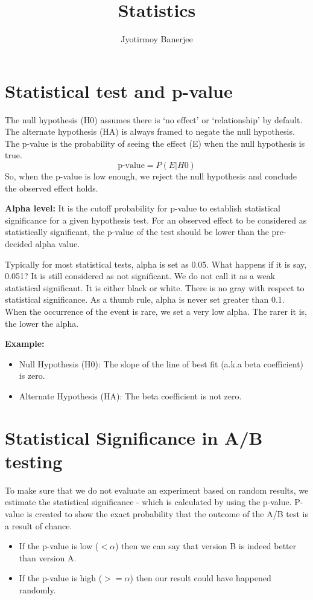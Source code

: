 \documentclass{article}
\title{Statistics}
\author{Jyotirmoy Banerjee}
\begin{document}
\maketitle

\section{Statistical test and p-value}
The null hypothesis (H0) assumes there is `no effect' or `relationship' by default. The alternate hypothesis (HA) is always framed to negate the null hypothesis. The p-value is the probability of seeing the effect (E) when the null hypothesis is true.
\[
\text{p-value} = P(E|H0)
\]
So, when the p-value is low enough, we reject the null hypothesis and conclude the observed effect holds.

\textbf{Alpha level:}
It is the cutoff probability for p-value to establish statistical significance for a given hypothesis test.
For an observed effect to be considered as statistically significant, the p-value of the test should be lower than the pre-decided alpha value.

Typically for most statistical tests, alpha is set as 0.05. 
What happens if it is say, 0.051? It is still considered as not significant. We do not call it as a weak statistical significant. It is either black or white. There is no gray with respect to statistical significance.
As a thumb rule, alpha is never set greater than 0.1. When the occurrence of the event is rare, we set a very low alpha. The rarer it is, the lower the alpha.

\textbf{Example:}
\vspace{-\topsep}
\begin{itemize}
\itemsep0em
\item Null Hypothesis (H0): The slope of the line of best fit (a.k.a beta coefficient) is zero.
\item Alternate Hypothesis (HA): The beta coefficient is not zero.
\end{itemize}
\vspace{-\topsep}

\section{Statistical Significance in A/B testing}
To make sure that we do not evaluate an experiment based on random results, we estimate the statistical significance - which is calculated by using the p-value.
P-value is created to show the exact probability that the outcome of the A/B test is a result of chance.
\vspace{-\topsep}
\begin{itemize} 
\itemsep0em
\item If the p-value is low ($<\alpha$) then we can say that version B is indeed better than version A.
\item If the p-value is high ($>=\alpha$) then our result could have happened randomly.
\end{itemize}
\vspace{-\topsep}
\end{document}
